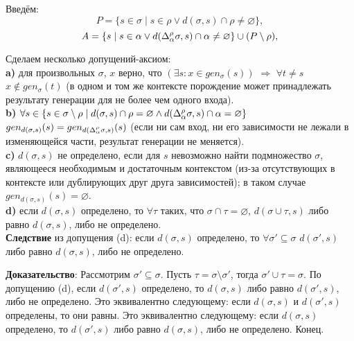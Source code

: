 





\hrulefill

Введём:
$$P = \{s \in \sigma \mid s \in \rho \vee d(\sigma, s) \cap \rho \neq \varnothing \},$$
$$A = \{s \mid s \in \alpha \vee d(\Delta_\alpha^\rho\sigma, s) \cap \alpha \neq \varnothing \} \cup (P \setminus \rho),$$

Сделаем несколько допущений-аксиом:\\
\indent \textbf{a)} для произвольных $\sigma$, $x$ верно, что $(\exists s: x \in gen_\sigma(s))$ $\Rightarrow$ $\forall t \neq s$ $x \notin gen_\sigma(t)$ (в одном и том же контексте порождение может принадлежать результату генерации для не более чем одного входа).\\
\indent \textbf{b)} $\forall s \in \{s \in \sigma \setminus \rho \mid d(\sigma, s) \cap \rho = \varnothing \wedge d(\Delta_\alpha^\rho\sigma, s) \cap \alpha = \varnothing \}$ $gen_{d(\sigma, s)} (s) = gen_{d(\Delta_\alpha^\rho\sigma, s)} (s)$ (если ни сам вход, ни его зависимости не лежали в изменяющейся части, результат генерации не меняется).\\
\indent \textbf{c)} $d(\sigma, s)$ не определено, если для $s$ невозможно найти подмножество $\sigma$, являющееся необходимым и достаточным контекстом (из-за отсутствующих в контексте или дублирующих друг друга зависимостей); в таком случае $gen_{d(\sigma, s)}(s) = \varnothing$.\\
\indent \textbf{d)} если $d(\sigma, s)$ определено, то $\forall \tau$ таких, что $\sigma \cap \tau = \varnothing$, $d(\sigma \cup \tau, s)$ либо равно $d(\sigma, s)$, либо не определено.\\

\textbf{Следствие} из допущения (d): если $d(\sigma, s)$ определено, то $\forall \sigma' \subseteq \sigma$ $d(\sigma', s)$ либо равно $d(\sigma, s)$, либо не определено.

\textbf{Доказательство}: Рассмотрим $\sigma' \subseteq \sigma$. Пусть $\tau = \sigma \setminus \sigma'$, тогда $\sigma' \cup \tau = \sigma$. По допущению (d), если $d(\sigma', s)$ определено, то $d(\sigma, s)$ либо равно $d(\sigma', s)$, либо не определено. Это эквивалентно следующему: если $d(\sigma, s)$ и $d(\sigma', s)$ определены, то они равны. Это эквивалентно следующему: если $d(\sigma, s)$ определено, то $d(\sigma', s)$ либо равно $d(\sigma, s)$, либо не определено. Конец.\\

